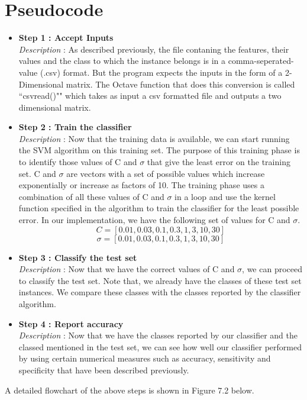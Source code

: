 \documentclass[11pt,a4paper]{report}
\begin{document}
{\section{Pseudocode}

\bigskip
\begin{itemize}
\item \textbf{Step 1 : Accept Inputs}\\
\emph{Description} : As described previously, the file contaning the features, their values and the class to which the instance belongs is in a comma-seperated-value (.csv) format. But the program expects the inputs in the form of a 2-Dimensional matrix. The Octave function that does this conversion is called ``csvread()"" which takes as input a csv formatted file and outputs a two dimensional matrix.\\
\item \textbf{Step 2 : Train the classifier}\\
\emph{Description} : Now that the training data is available, we can start running the SVM algorithm on this training set. The purpose of this training phase is to identify those values of C and $\sigma$ that give the least error on the training set. C and $\sigma$ are vectors with a set of possible values which increase exponentially or increase as factors of 10. The training phase uses a combination of all these values of C and $\sigma$ in a loop and use the kernel function specified in the algorithm to train the classifier for the least possible error. In our implementation, we have the following set of values for C and $\sigma$.\\
\begin{equation}C = [0.01, 0.03, 0.1, 0.3, 1, 3, 10, 30]\end{equation}
\begin{equation}\sigma = [0.01, 0.03, 0.1, 0.3, 1, 3, 10, 30]\end{equation}
\item \textbf{Step 3 : Classify the test set}\\
\emph{Description} : Now that we have the correct values of C and $\sigma$, we can proceed to classify the test set. Note that, we already have the classes of these test set instances. We compare these classes with the classes reported by the classifier algorithm.\\
\item \textbf{Step 4 : Report accuracy}\\
\emph{Description} : Now that we have the classes reported by our classifier and the classed mentioned in the test set, we can see how well our classifier performed by using certain numerical measures such as accuracy, sensitivity and specificity that have been described previously.
\end{itemize}
A detailed flowchart of the above steps is shown in Figure 7.2 below.\\

}
\end{document}
